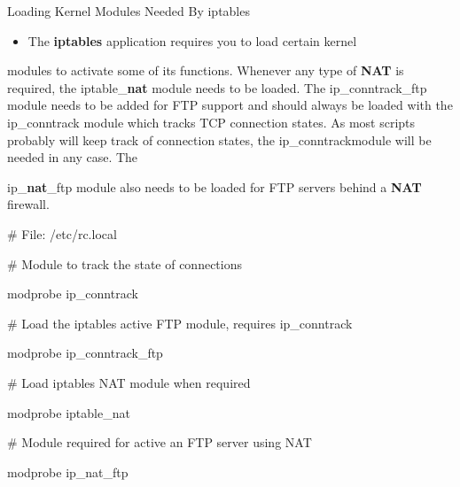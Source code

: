 \begin{frame}[t,allowframebreaks]{Loading Kernel Modules Needed By iptables}
  \fontsize{15}{18}\selectfont
  \begin{itemize}
    \item The \textcolor{CommandGreen}{\bfseries iptables} application requires you to load certain kernel
  \end{itemize}
  modules to activate some of its functions. Whenever any type of \textcolor{CommandGreen}{\bfseries NAT} is required, the iptable\_\textcolor{CommandGreen}{\bfseries nat} module needs to be loaded. The ip\_conntrack\_ftp module needs to be added for FTP support and should always be loaded with the ip\_conntrack module which tracks TCP connection states. As most scripts probably will keep track of connection states, the ip\_conntrackmodule will be needed in any case. The\par
  ip\_\textcolor{CommandGreen}{\bfseries nat}\_ftp module also needs to be loaded for FTP servers behind a \textcolor{CommandGreen}{\bfseries NAT} firewall.\par
  \vspace{0.08cm}
  {\color{CommandGreen}\ttfamily\fontsize{13.5}{16.5}\selectfont \# File: /etc/rc.local\par}
  \vspace{0.08cm}
  {\color{CommandGreen}\ttfamily\fontsize{13.5}{16.5}\selectfont \# Module to track the state of connections\par}
  \vspace{0.08cm}
  {\color{CommandGreen}\ttfamily\fontsize{13.5}{16.5}\selectfont modprobe ip\_conntrack\par}
  \vspace{0.08cm}
  {\color{CommandGreen}\ttfamily\fontsize{13.5}{16.5}\selectfont \# Load the iptables active FTP module, requires ip\_conntrack\par}
  \vspace{0.08cm}
  {\color{CommandGreen}\ttfamily\fontsize{13.5}{16.5}\selectfont modprobe ip\_conntrack\_ftp\par}
  \vspace{0.08cm}
  {\color{CommandGreen}\ttfamily\fontsize{13.5}{16.5}\selectfont \# Load iptables NAT module when required\par}
  \vspace{0.08cm}
  {\color{CommandGreen}\ttfamily\fontsize{13.5}{16.5}\selectfont modprobe iptable\_nat\par}
  \vspace{0.08cm}
  {\color{CommandGreen}\ttfamily\fontsize{13.5}{16.5}\selectfont \# Module required for active an FTP server using NAT\par}
  \vspace{0.08cm}
  {\color{CommandGreen}\ttfamily\fontsize{13.5}{16.5}\selectfont modprobe ip\_nat\_ftp\par}
\end{frame}
